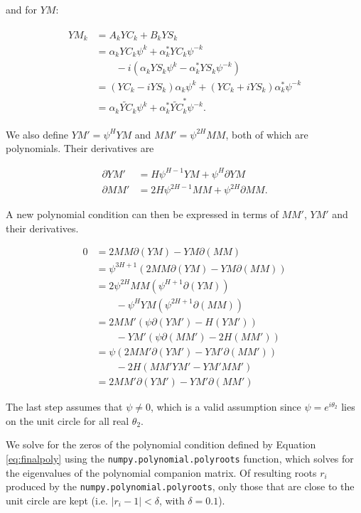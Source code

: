 \documentclass[apj]{emulateapj}
\newcommand{\YCt}{\widetilde{YC}}
\newcommand{\eith}{\psi}
\begin{document}
and for $YM$:

\begin{align}
\begin{split}
YM_{k} &= A_kYC_k + B_kYS_k\\
        &= \alpha_kYC_k\eith^k + \alpha_k^{*}YC_k\eith^{-k} \\
        &\qquad - i\left(\alpha_kYS_k\eith^k - \alpha^{*}_kYS_k\eith^{-k}\right)\\
        &= (YC_k - iYS_k)\alpha_k\eith^k + (YC_k + iYS_k)\alpha^{*}_k\eith^{-k}\\
        &= \alpha_k\YCt_k \eith^k + \alpha^{*}_k\YCt_k^{*} \eith^{-k}.
\end{split}
\end{align}


We also define $YM' = \eith^H YM$ and $MM' = \eith^{2H}MM$, both of which are polynomials. Their derivatives
are

\begin{align}
\partial YM' &= H\eith^{H-1} YM + \eith^H \partial YM\\
\partial MM' &= 2H\eith^{2H-1} MM + \eith^{2H}\partial MM.
\end{align}

A new polynomial condition can then be expressed in terms of $MM'$, $YM'$ and their derivatives.

\begin{align}\label{eq:finalpoly}
0 &= 2MM\partial(YM) - YM\partial(MM)\\
  &= \eith^{3H+1}\left(2MM\partial(YM) - YM\partial(MM)\right)\\
  &= 2\eith^{2H}MM\left(\eith^{H+1}\partial(YM)\right) \nonumber \\
  &\qquad - \eith^HYM\left(\eith^{2H+1}\partial(MM)\right)\\
  &= 2MM'\left(\eith\partial(YM') - H(YM')\right) \nonumber \\
  &\qquad - YM'\left(\eith\partial(MM') - 2H(MM')\right)\\
  &= \eith\left(2MM'\partial(YM') - YM'\partial(MM')\right) \nonumber \\
  &\qquad- 2H\left(MM'YM' - YM'MM'\right)\\
  &= 2MM'\partial(YM') - YM'\partial(MM')
\end{align}

The last step assumes that $\eith\ne 0$, which is a valid assumption since $\eith=e^{i\theta_2}$ lies on the
unit circle for all real $\theta_2$.

We solve for the zeros of the polynomial condition defined by Equation \ref{eq:finalpoly}
using the \texttt{numpy.polynomial.polyroots} function, which solves for the eigenvalues 
of the polynomial companion matrix. Of resulting roots $r_i$ produced by the \texttt{numpy.polynomial.polyroots},
only those that are close to the unit circle are kept (i.e. $|r_i - 1| < \delta$, with $\delta = 0.1$).
\end{document}
